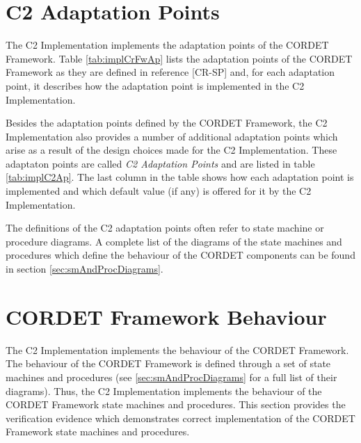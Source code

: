 \documentclass{pnp_article}
\begin{document}
\section{C2 Adaptation Points}\label{sec:implC2Ap}
The C2 Implementation implements the adaptation points of the CORDET Framework.
Table \ref{tab:implCrFwAp} lists the adaptation points of the CORDET Framework as they are defined in reference [CR-SP] and, for each adaptation point, it describes how the adaptation point is implemented in the C2 Implementation. 

Besides the adaptation points defined by the CORDET Framework, the C2 Implementation also provides a number of additional adaptation points which arise as a result of the design choices made for the C2 Implementation. These adaptaton points are called \textit{C2 Adaptation Points} and are listed in table \ref{tab:implC2Ap}. The last column in the table shows how each adaptation point is implemented and which default value (if any) is offered for it by the C2 Implementation.

The definitions of the C2 adaptation points often refer to state machine or procedure diagrams. A complete list of the diagrams of the state machines and procedures which define the behaviour of the CORDET components can be found in section \ref{sec:smAndProcDiagrams}.

\begin{landscape}


\end{landscape}




\section{CORDET Framework Behaviour}\label{sec:verCrFwBehaviour}
The C2 Implementation implements the behaviour of the CORDET Framework. The behaviour of the CORDET Framework is defined through a set of state machines and procedures (see \ref{sec:smAndProcDiagrams} for a full list of their diagrams). Thus, the C2 Implementation implements the behaviour of the CORDET Framework state machines and procedures. This section provides the verification evidence which demonstrates correct implementation of the CORDET Framework state machines and procedures.  
\end{document}
